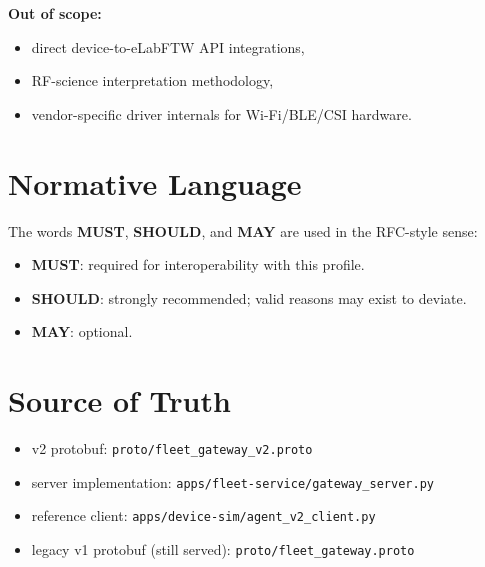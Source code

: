 \documentclass[11pt,a4paper]{article}
\begin{document}
\textbf{Out of scope:}
\begin{itemize}
  \item direct device-to-eLabFTW API integrations,
  \item RF-science interpretation methodology,
  \item vendor-specific driver internals for Wi-Fi/BLE/CSI hardware.
\end{itemize}

\section{Normative Language}
The words \textbf{MUST}, \textbf{SHOULD}, and \textbf{MAY} are used in the RFC-style sense:
\begin{itemize}
  \item \textbf{MUST}: required for interoperability with this profile.
  \item \textbf{SHOULD}: strongly recommended; valid reasons may exist to deviate.
  \item \textbf{MAY}: optional.
\end{itemize}

\section{Source of Truth}
\begin{itemize}
  \item v2 protobuf: \texttt{proto/fleet\_gateway\_v2.proto}
  \item server implementation: \texttt{apps/fleet-service/gateway\_server.py}
  \item reference client: \texttt{apps/device-sim/agent\_v2\_client.py}
  \item legacy v1 protobuf (still served): \texttt{proto/fleet\_gateway.proto}
\end{itemize}
\end{document}
